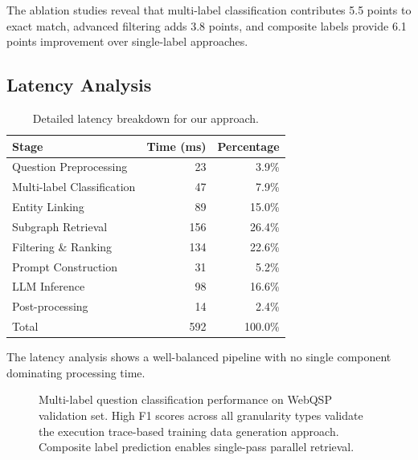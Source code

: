 \documentclass[conference]{IEEEtran}
\begin{document}
The ablation studies reveal that multi-label classification contributes 5.5 points to exact match, advanced filtering adds 3.8 points, and composite labels provide 6.1 points improvement over single-label approaches.

\subsection{Latency Analysis}

\begin{table}[t]
\centering
\caption{Detailed latency breakdown for our approach.}
\label{tab:latency}
\begin{tabular}{lrr}
\toprule
Stage & Time (ms) & Percentage \\
\midrule
Question Preprocessing & 23 & 3.9\% \\
Multi-label Classification & 47 & 7.9\% \\
Entity Linking & 89 & 15.0\% \\
Subgraph Retrieval & 156 & 26.4\% \\
Filtering \& Ranking & 134 & 22.6\% \\
Prompt Construction & 31 & 5.2\% \\
LLM Inference & 98 & 16.6\% \\
Post-processing & 14 & 2.4\% \\
\midrule
Total & 592 & 100.0\% \\
\bottomrule
\end{tabular}
\end{table}

The latency analysis shows a well-balanced pipeline with no single component dominating processing time.

\begin{figure}[t]
\centering
{}
\caption{Multi-label question classification performance on WebQSP validation set. High F1 scores across all granularity types validate the execution trace-based training data generation approach. Composite label prediction enables single-pass parallel retrieval.}
\label{fig:confusion}
\end{figure}
\end{document}
